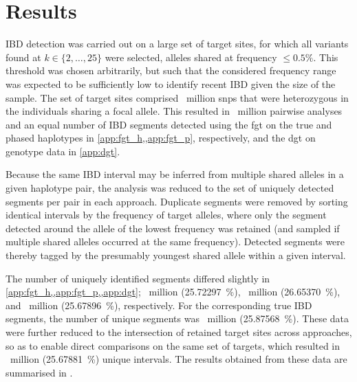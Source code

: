 %
\section{Results}
\label{sec:ibd_results}
%

IBD detection was carried out on a large set of target sites, for which all \fk{} variants found at ${k \in \lbrace 2, \ldots, 25 \rbrace}$ were selected, \ie alleles shared at frequency ${\leq 0.5\%}$.
This threshold was chosen arbitrarily, but such that the considered frequency range was expected to be sufficiently low to identify recent IBD given the size of the sample.
The set of target sites comprised ~million \glspl{snp} that were heterozygous in the individuals sharing a focal allele.
This resulted in ~million pairwise analyses and an equal number of IBD segments detected using the \gls{fgt} on the true and phased haplotypes in \cref{app:fgt_h,,app:fgt_p}, respectively, and the \gls{dgt} on genotype data in \cref{app:dgt}.

Because the same IBD interval may be inferred from multiple shared alleles in a given haplotype pair, the analysis was reduced to the set of uniquely detected segments per pair in each approach.
Duplicate segments were removed by sorting identical intervals by the frequency of target alleles, where only the segment detected around the allele of the lowest frequency was retained (and sampled if multiple shared alleles occurred at the same frequency).
Detected segments were thereby tagged by the presumably youngest shared allele within a given interval.

The number of uniquely identified segments differed slightly in \cref{app:fgt_h,,app:fgt_p,,app:dgt};
~million (\SI{25.72297}{\percent}),
~million (\SI{26.65370}{\percent}), and
~million (\SI{25.67896}{\percent}), respectively.
For the corresponding true IBD segments, the number of unique segments was ~million (\SI{25.87568}{\percent}).
These data were further reduced to the intersection of retained target sites across approaches, so as to enable direct comparisons on the same set of targets, which resulted in ~million (\SI{25.67881}{\percent}) unique intervals.
The results obtained from these data are summarised in .

